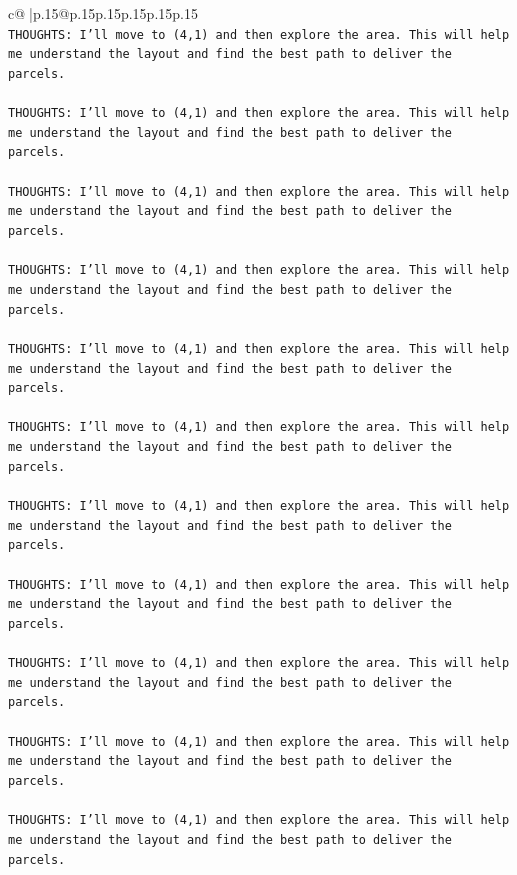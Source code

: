 \documentclass{article}
\begin{document}
{\begin{supertabular}{c@{$\;$}|p{.15\linewidth}@{}p{.15\linewidth}p{.15\linewidth}p{.15\linewidth}p{.15\linewidth}p{.15\linewidth}}
{{{\\ 
\texttt{THOUGHTS: I'll move to (4,1) and then explore the area. This will help me understand the layout and find the best path to deliver the parcels.} \\
\\ 
\texttt{THOUGHTS: I'll move to (4,1) and then explore the area. This will help me understand the layout and find the best path to deliver the parcels.} \\
\\ 
\texttt{THOUGHTS: I'll move to (4,1) and then explore the area. This will help me understand the layout and find the best path to deliver the parcels.} \\
\\ 
\texttt{THOUGHTS: I'll move to (4,1) and then explore the area. This will help me understand the layout and find the best path to deliver the parcels.} \\
\\ 
\texttt{THOUGHTS: I'll move to (4,1) and then explore the area. This will help me understand the layout and find the best path to deliver the parcels.} \\
\\ 
\texttt{THOUGHTS: I'll move to (4,1) and then explore the area. This will help me understand the layout and find the best path to deliver the parcels.} \\
\\ 
\texttt{THOUGHTS: I'll move to (4,1) and then explore the area. This will help me understand the layout and find the best path to deliver the parcels.} \\
\\ 
\texttt{THOUGHTS: I'll move to (4,1) and then explore the area. This will help me understand the layout and find the best path to deliver the parcels.} \\
\\ 
\texttt{THOUGHTS: I'll move to (4,1) and then explore the area. This will help me understand the layout and find the best path to deliver the parcels.} \\
\\ 
\texttt{THOUGHTS: I'll move to (4,1) and then explore the area. This will help me understand the layout and find the best path to deliver the parcels.} \\
\\ 
\texttt{THOUGHTS: I'll move to (4,1) and then explore the area. This will help me understand the layout and find the best path to deliver the parcels.} \\
}}}
\end{supertabular}}
\end{document}
